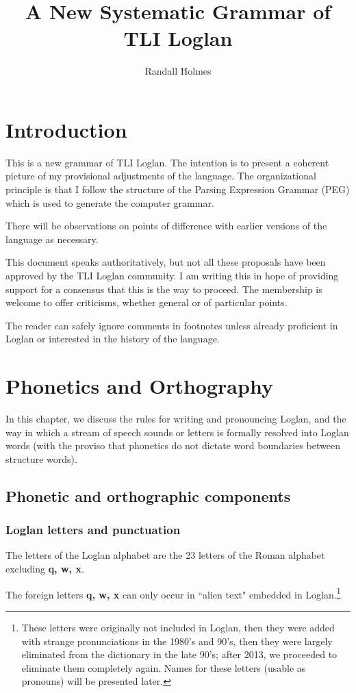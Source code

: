 \documentclass[12pt]{book}
\title{A New Systematic Grammar of TLI Loglan}
\author{Randall Holmes}
\begin{document}
\maketitle

\chapter{Introduction}

This is a new grammar of TLI Loglan.   The intention is to present a coherent picture of my provisional adjustments of the language.  The organizational principle is that I follow the structure of the Parsing  Expression Grammar (PEG) which is used to generate the computer grammar.

There will be observations on points of difference with earlier versions of the language as necessary.

This document speaks authoritatively, but not all these proposals have been approved by the TLI Loglan community.  I am writing this in hope of providing support for a consensus that this is the way to proceed.  The membership is welcome to offer criticisms, whether general or of particular points.

The reader can safely ignore comments in footnotes unless already proficient in Loglan or interested in the history of the language.

\chapter{Phonetics and Orthography}

In this chapter, we discuss the rules for writing and pronouncing Loglan, and the way in which a stream of speech sounds or letters is formally resolved into Loglan words (with the proviso that phonetics do not dictate word boundaries between structure words).

\section{Phonetic and orthographic components}


\subsection{Loglan letters and punctuation}

The letters of the Loglan alphabet are the 23 letters of the Roman alphabet excluding {\bf q, w, x}. 

 The foreign letters {\bf q, w, x} can only occur in ``alien text" embedded in Loglan.\footnote{These letters were originally not included in Loglan, then they were added with strange pronunciations in the 1980's and 90's, then they were largely eliminated from the dictionary in the late 90's;  after 2013, we proceeded to eliminate them completely again.   Names for these letters (usable as pronouns) will be presented later.}
\end{document}
